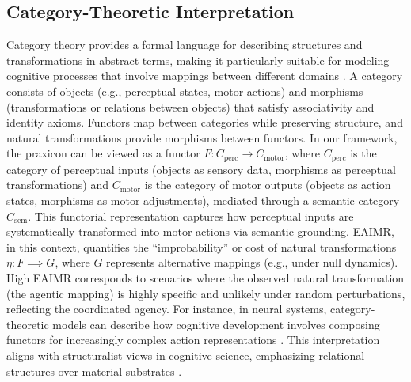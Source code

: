 \documentclass{article}
\begin{document}
\subsection{Category-Theoretic Interpretation}
Category theory provides a formal language for describing structures and transformations in abstract terms, making it particularly suitable for modeling cognitive processes that involve mappings between different domains \citep{healy2022,phillips2021}. A category consists of objects (e.g., perceptual states, motor actions) and morphisms (transformations or relations between objects) that satisfy associativity and identity axioms. Functors map between categories while preserving structure, and natural transformations provide morphisms between functors. In our framework, the praxicon can be viewed as a functor $F : C_{\mathrm{perc}} \to C_{\mathrm{motor}}$, where $C_{\mathrm{perc}}$ is the category of perceptual inputs (objects as sensory data, morphisms as perceptual transformations) and $C_{\mathrm{motor}}$ is the category of motor outputs (objects as action states, morphisms as motor adjustments), mediated through a semantic category $C_{\mathrm{sem}}$. This functorial representation captures how perceptual inputs are systematically transformed into motor actions via semantic grounding. EAIMR, in this context, quantifies the ``improbability'' or cost of natural transformations $\eta : F \implies G$, where $G$ represents alternative mappings (e.g., under null dynamics). High EAIMR corresponds to scenarios where the observed natural transformation (the agentic mapping) is highly specific and unlikely under random perturbations, reflecting the coordinated agency. For instance, in neural systems, category-theoretic models can describe how cognitive development involves composing functors for increasingly complex action representations \citep{ehresmann1980}. This interpretation aligns with structuralist views in cognitive science, emphasizing relational structures over material substrates \citep{ehresmann2021}.
\end{document}
